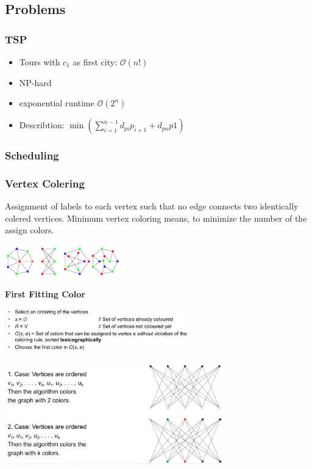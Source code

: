 \documentclass[10pt,a4paper,twocolumn]{article}
\begin{document}
\subsection{Problems}
\subsubsection{TSP}
\begin{itemize}
	\item Tours with $c_{1}$ as first city: $\mathcal{O}(n!)$
	\item NP-hard
	\item exponential runtime $\mathcal{O}(2^n)$
	\item Describtion: $\min \left(\sum_{i=1}^{n-1} d_{p i} p_{i+1}+d_{p n} p 1\right)$
\end{itemize}

\subsubsection{Scheduling}


\subsubsection{Vertex Colering}
Assignment of labels to each vertex such that no edge connects two identically colered vertices. Minimum vertex coloring means, to minimize the number of the assign colors.

\begin{center}
	\includegraphics[width=5cm]{images/vertex-colering-example}
\end{center}

\textbf{First Fitting Color}
\begin{center}
	\includegraphics[width=8cm]{images/first-fitting-color}
\end{center}

\begin{center}
	\includegraphics[width=9.5cm]{images/first-fitting-color-example}
\end{center}
\end{document}
